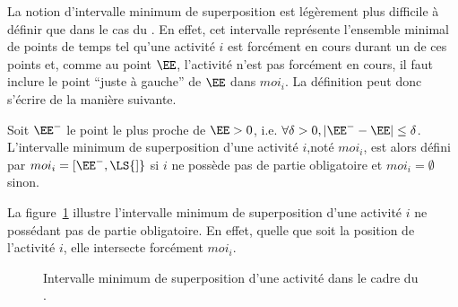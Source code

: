 La notion d'intervalle minimum de superposition est légèrement plus
difficile à définir que dans le cas du \CUSP. En effet, cet intervalle
représente l'ensemble minimal de points de temps tel qu'une activité
$i$ est forcément en cours durant un de ces points et, comme au point
$\EE$, l'activité n'est pas forcément en cours, il faut inclure le
point ``juste à gauche'' de $\EE$ dans $moi_i$.  La définition peut
donc s'écrire de la manière suivante. 

\begin{defi}
\label{des:moi_CUSP} 
Soit $\EE^{-}$ le point le plus proche de $\EE > 0$, i.e. $\forall \delta
>0 , |\EE^{-} -\EE| \le \delta$. L'intervalle minimum de
superposition d'une activité $i$,noté $moi_i$, est alors défini par
$moi_i=[\EE^{-},\LS{]}$ si $i$ ne possède pas de partie obligatoire et
$moi_i=\emptyset$ sinon.   
\end{defi}

\begin{ex}
La figure~\ref{fig:moi_CECSP} illustre l'intervalle minimum de
superposition d'une activité $i$ ne possédant pas de partie
obligatoire. En effet, quelle que soit la position de l'activité $i$,
elle intersecte forcément $moi_i$.
\begin{figure}[!htb]
  \begin{center}
  \end{center}

  \caption{Intervalle minimum de superposition d'une activité dans le
    cadre du \CECSP.}
  \label{fig:moi_CECSP}
\end{figure}
\end{ex}

